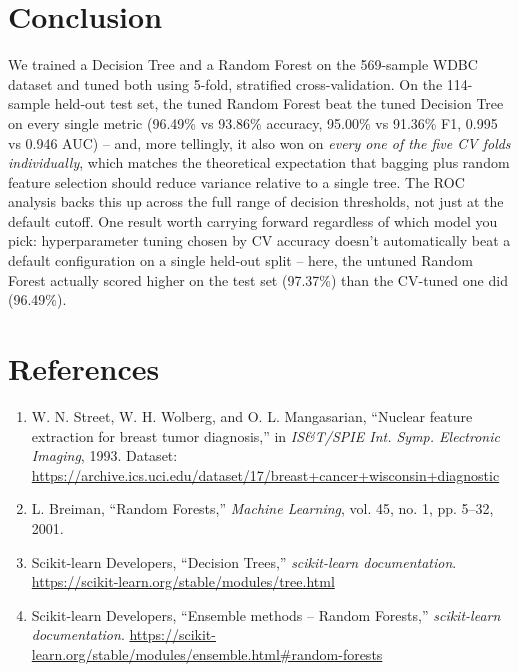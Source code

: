 \documentclass[12pt,a4paper]{article}
\begin{document}
\section{Conclusion}
We trained a Decision Tree and a Random Forest on the 569-sample WDBC dataset and tuned both using 5-fold, stratified cross-validation. On the 114-sample held-out test set, the tuned Random Forest beat the tuned Decision Tree on every single metric (96.49\% vs 93.86\% accuracy, 95.00\% vs 91.36\% F1, 0.995 vs 0.946 AUC) -- and, more tellingly, it also won on \emph{every one of the five CV folds individually}, which matches the theoretical expectation that bagging plus random feature selection should reduce variance relative to a single tree. The ROC analysis backs this up across the full range of decision thresholds, not just at the default cutoff. One result worth carrying forward regardless of which model you pick: hyperparameter tuning chosen by CV accuracy doesn't automatically beat a default configuration on a single held-out split -- here, the untuned Random Forest actually scored higher on the test set (97.37\%) than the CV-tuned one did (96.49\%).

\section{References}
\begin{enumerate}
    \item W. N. Street, W. H. Wolberg, and O. L. Mangasarian, ``Nuclear feature extraction for breast tumor diagnosis,'' in \textit{IS\&T/SPIE Int. Symp. Electronic Imaging}, 1993. Dataset: \url{https://archive.ics.uci.edu/dataset/17/breast+cancer+wisconsin+diagnostic}
    \item L. Breiman, ``Random Forests,'' \textit{Machine Learning}, vol. 45, no. 1, pp. 5--32, 2001.
    \item Scikit-learn Developers, ``Decision Trees,'' \textit{scikit-learn documentation}. \url{https://scikit-learn.org/stable/modules/tree.html}
    \item Scikit-learn Developers, ``Ensemble methods -- Random Forests,'' \textit{scikit-learn documentation}. \url{https://scikit-learn.org/stable/modules/ensemble.html\#random-forests}
\end{enumerate}
\end{document}
